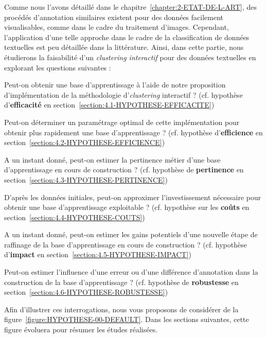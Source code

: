 	Comme nous l'avons détaillé dans le chapitre~\ref{chapter:2-ETAT-DE-L-ART}, des procédés d'annotation similaires existent pour des données facilement visualisables, comme dans le cadre du traitement d'images. Cependant, l'application d'une telle approche dans le cadre de la classification de données textuelles est peu détaillée dans la littérature. Ainsi, dans cette partie, nous étudierons la faisabilité d'un \textit{clustering interactif} pour des données textuelles en explorant les questions suivantes :
	\begin{todolist}
		\item Peut-on obtenir une base d'apprentissage à l'aide de notre proposition d'implémentation de la méthodologie d'\textit{clustering} interactif ? (cf. hypothèse d'\textbf{efficacité} en section~\ref{section:4.1-HYPOTHESE-EFFICACITE})
		\item Peut-on déterminer un paramétrage optimal de cette implémentation pour obtenir plus rapidement une base d'apprentissage ? (cf. hypothèse d'\textbf{efficience} en section~\ref{section:4.2-HYPOTHESE-EFFICIENCE})
		\item A un instant donné, peut-on estimer la pertinence métier d'une base d'apprentissage en cours de construction ? (cf. hypothèse de \textbf{pertinence} en section~\ref{section:4.3-HYPOTHESE-PERTINENCE})
		\item D'après les données initiales, peut-on approximer l'investissement nécessaire pour obtenir une base d'apprentissage exploitable ? (cf. hypothèse sur les \textbf{coûts} en section~\ref{section:4.4-HYPOTHESE-COUTS})
		\item A un instant donné, peut-on estimer les gains potentiels d'une nouvelle étape de raffinage de la base d'apprentissage en cours de construction ? (cf. hypothèse d'\textbf{impact} en section~\ref{section:4.5-HYPOTHESE-IMPACT})
		\item Peut-on estimer l'influence d'une erreur ou d'une différence d'annotation dans la construction de la base d'apprentissage ? (cf. hypothèse de \textbf{robustesse} en section~\ref{section:4.6-HYPOTHESE-ROBUSTESSE})
	\end{todolist}
	
	Afin d'illustrer ces interrogations, nous vous proposons de considérer de la figure~\ref{figure:HYPOTHESE-00-DEFAULT}. Dans les sections suivantes, cette figure évoluera pour résumer les études réalisées.
	
